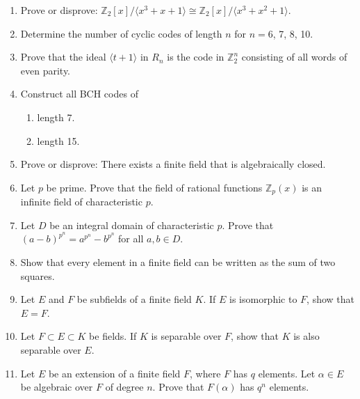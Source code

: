 {\begin{enumerate}
\item
Prove or disprove: ${\mathbb Z}_2[x] / \langle x^3 + x + 1 \rangle \cong
{\mathbb Z}_2[x] / \langle x^3 + x^2 + 1 \rangle$. 


\item
Determine the number of cyclic codes of length $n$ for $n = 6$, 7, 8,
10.


\item
Prove that the ideal $\langle t + 1 \rangle$ in $R_n$ is the code in
${\mathbb Z}_2^n$ consisting of all words of even parity.


\item
Construct all BCH codes of
\begin{multicols}{2}
\begin{enumerate}

\item
length 7.

\item
length 15.

\end{enumerate}
\end{multicols}






\item
Prove or disprove: There exists a finite field that is algebraically
closed. 


\item
Let $p$ be prime.  Prove that the field of rational functions ${\mathbb
Z}_p(x)$ is an infinite field of characteristic $p$.


\item
Let $D$ be an integral domain of characteristic $p$.  Prove that $(a -
b)^{p^n} = a^{p^n} - b^{p^n}$ for all $a, b \in D$.


\item
Show that every element in a finite field can be written as the sum
of two squares.




\item
Let $E$ and $F$ be subfields of a finite field $K$. If $E$ is
isomorphic to $F$, show that $E=F$.


\item
Let $F \subset E \subset K$ be fields. If $K$ is separable over $F$,
show that $K$ is also separable over $E$.


\item
Let $E$ be an extension of a finite field $F$, where $F$ has $q$
elements. Let $\alpha \in E$ be algebraic over $F$ of degree $n$.
Prove that $F( \alpha )$ has $q^n$ elements. 



\end{enumerate}}
